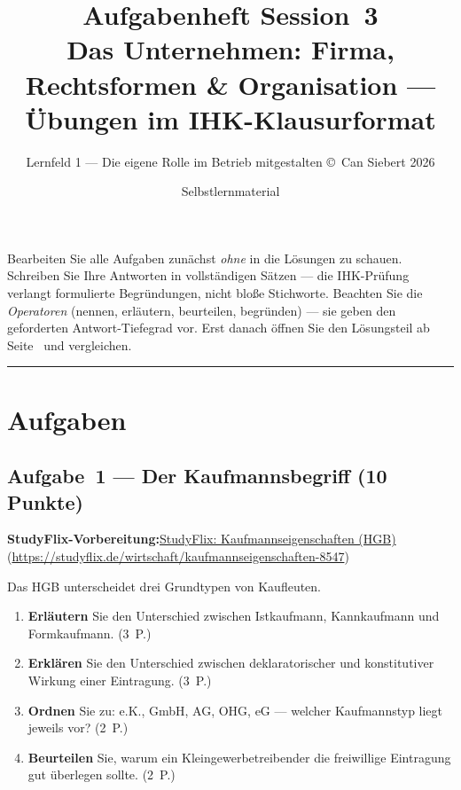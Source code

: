 \documentclass[11pt, a4paper]{article}
\title{\vspace*{-1.5cm}\Huge\bfseries\color{bfwPrimaryDark}Aufgabenheft Session~3\\[0.4em]
  \large\color{bfwInkSoft}\textnormal{Das Unternehmen: Firma, Rechtsformen \& Organisation --- Übungen im IHK-Klausurformat}}
\author{\textsf{Lernfeld 1 --- Die eigene Rolle im Betrieb mitgestalten \textperiodcentered{} \small\copyright\ Can Siebert\,\textperiodcentered\,2026}}
\date{Selbstlernmaterial}
\begin{document}
\maketitle
\thispagestyle{empty}

\begin{merksatz}[title={\bfseries So nutzen Sie dieses Aufgabenheft}]
Bearbeiten Sie alle Aufgaben zunächst \emph{ohne} in die Lösungen zu schauen. Schreiben
Sie Ihre Antworten in vollständigen Sätzen --- die IHK-Prüfung verlangt formulierte
Begründungen, nicht bloße Stichworte. Beachten Sie die \emph{Operatoren} (nennen,
erläutern, beurteilen, begründen) --- sie geben den geforderten Antwort-Tiefegrad vor.
Erst danach öffnen Sie den Lösungsteil ab Seite~\pageref{loesungen} und vergleichen.
\end{merksatz}

\tableofcontents
\vspace{1em}
\hrule

\section{Aufgaben}

\subsection*{Aufgabe~1 --- Der Kaufmannsbegriff (10 Punkte)}

\noindent\textbf{\color{bfwAccent}StudyFlix-Vorbereitung:}\enspace \href{https://studyflix.de/wirtschaft/kaufmannseigenschaften-8547}{StudyFlix: Kaufmannseigenschaften (HGB)} (\url{https://studyflix.de/wirtschaft/kaufmannseigenschaften-8547})

\medskip
Das HGB unterscheidet drei Grundtypen von Kaufleuten.

\begin{enumerate}[label=(\alph*)]
  \item \textbf{Erläutern} Sie den Unterschied zwischen Istkaufmann, Kannkaufmann und Formkaufmann. \hfill (3~P.)
  \item \textbf{Erklären} Sie den Unterschied zwischen deklaratorischer und konstitutiver Wirkung einer Eintragung. \hfill (3~P.)
  \item \textbf{Ordnen} Sie zu: e.K., GmbH, AG, OHG, eG --- welcher Kaufmannstyp liegt jeweils vor? \hfill (2~P.)
  \item \textbf{Beurteilen} Sie, warum ein Kleingewerbetreibender die freiwillige Eintragung gut überlegen sollte. \hfill (2~P.)
\end{enumerate}
\end{document}
